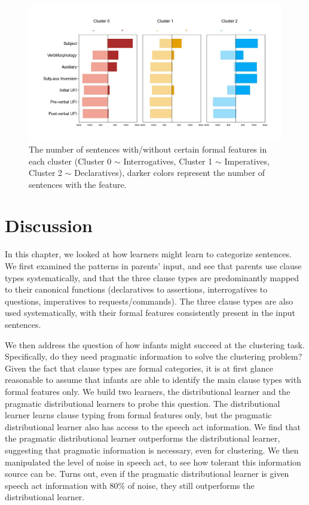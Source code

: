 \begin{figure}[H]
    \centering
    \includegraphics[width=1\textwidth]{figures/noisy100-syncluster.jpg}
    \caption{The number of sentences with/without certain formal features in each cluster (Cluster 0 $\sim$ Interrogatives, Cluster 1 $\sim$ Imperatives, Cluster 2 $\sim$ Declaratives), darker colors represent the number of sentences with the feature.}
    \label{fig:noisy100-syncluster}
\end{figure}


\section{Discussion}
\label{sec:engcl:discussion}

In this chapter, we looked at how learners might learn to categorize sentences. We first examined the patterns in parents' input, and see that parents use clause types systematically, and that the three clause types are predominantly mapped to their canonical functions (declaratives to assertions, interrogatives to questions, imperatives to requests/commands). The three clause types are also used systematically, with their formal features consistently present in the input sentences. 

We then address the question of how infants might succeed at the clustering task. Specifically, do they need pragmatic information to solve the clustering problem? Given the fact that clause types are formal categories, it is at first glance reasonable to assume that infants are able to identify the main clause types with formal features only. We build two learners, the distributional learner and the pragmatic distributional learners to probe this question. The distributional learner learns clause typing from formal features only, but the pragmatic distributional learner also has access to the speech act information. We find that the pragmatic distributional learner outperforms the distributional learner, suggesting that pragmatic information is necessary, even for clustering. We then manipulated the level of noise in speech act, to see how tolerant this information source can be. Turns out, even if the pragmatic distributional learner is given speech act information with 80\% of noise, they still outperforms the distributional learner. 

